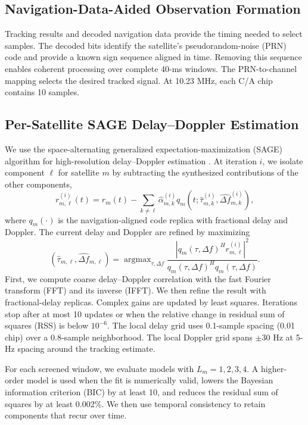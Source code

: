 \documentclass[conference]{IEEEtran}
\begin{document}
\subsection{Navigation-Data-Aided Observation Formation}
Tracking results and decoded navigation data provide the timing needed to select samples. The decoded bits identify the satellite's pseudorandom-noise (PRN) code and provide a known sign sequence aligned in time. Removing this sequence enables coherent processing over complete 40-ms windows. The PRN-to-channel mapping selects the desired tracked signal. At 10.23 MHz, each C/A chip contains 10 samples.

\subsection{Per-Satellite SAGE Delay--Doppler Estimation}
We use the space-alternating generalized expectation-maximization (SAGE) algorithm for high-resolution delay--Doppler estimation \cite{fessler1994sage,fleury1999sage}. At iteration $i$, we isolate component $\ell$ for satellite $m$ by subtracting the synthesized contributions of the other components,
\begin{equation}
r_{m,\ell}^{(i)}(t)=r_m(t)-\sum_{k\ne\ell}\hat{\alpha}_{m,k}^{(i)}q_m(t;\hat{\tau}_{m,k}^{(i)},\hat{\Delta f}_{m,k}^{(i)}),
\label{eq:hidden-signal}
\end{equation}
where $q_m(\cdot)$ is the navigation-aligned code replica with fractional delay and Doppler. The current delay and Doppler are refined by maximizing
\begin{equation}
(\hat{\tau}_{m,\ell},\hat{\Delta f}_{m,\ell})=\mathop{\arg\max}_{\tau,\Delta f}
\frac{|q_m(\tau,\Delta f)^{H}r_{m,\ell}^{(i)}|^2}{q_m(\tau,\Delta f)^{H}q_m(\tau,\Delta f)}.
\label{eq:sage-objective}
\end{equation}
First, we compute coarse delay--Doppler correlation with the fast Fourier transform (FFT) and its inverse (IFFT). We then refine the result with fractional-delay replicas. Complex gains are updated by least squares. Iterations stop after at most 10 updates or when the relative change in residual sum of squares (RSS) is below $10^{-6}$. The local delay grid uses 0.1-sample spacing (0.01 chip) over a 0.8-sample neighborhood. The local Doppler grid spans $\pm30$ Hz at 5-Hz spacing around the tracking estimate.

For each screened window, we evaluate models with $L_m=1,2,3,4$. A higher-order model is used when the fit is numerically valid, lowers the Bayesian information criterion (BIC) by at least 10, and reduces the residual sum of squares by at least 0.002\%. We then use temporal consistency to retain components that recur over time.
\end{document}
